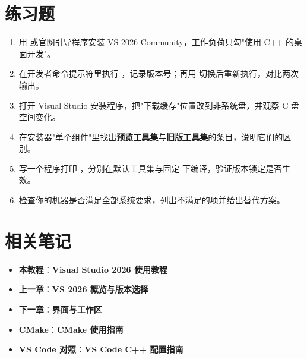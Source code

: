 \section{练习题}
\begin{enumerate}
  \item 用  或官网引导程序安装 VS 2026 Community，工作负荷只勾"使用 C++ 的桌面开发"。
  \item 在开发者命令提示符里执行 ，记录版本号；再用  切换后重新执行，对比两次输出。
  \item 打开 Visual Studio 安装程序，把"下载缓存"位置改到非系统盘，并观察 C 盘空间变化。
  \item 在安装器"单个组件"里找出\textbf{预览工具集}与\textbf{旧版工具集}的条目，说明它们的区别。
  \item 写一个程序打印 ，分别在默认工具集与固定  下编译，验证版本锁定是否生效。
  \item 检查你的机器是否满足全部系统要求，列出不满足的项并给出替代方案。
\end{enumerate}

\section{相关笔记}
\begin{itemize}
  \item \textbf{本教程}：\textbf{Visual Studio 2026 使用教程}
  \item \textbf{上一章}：\textbf{VS 2026 概览与版本选择}
  \item \textbf{下一章}：\textbf{界面与工作区}
  \item \textbf{CMake}：\textbf{CMake 使用指南}
  \item \textbf{VS Code 对照}：\textbf{VS Code C++ 配置指南}
\end{itemize}

